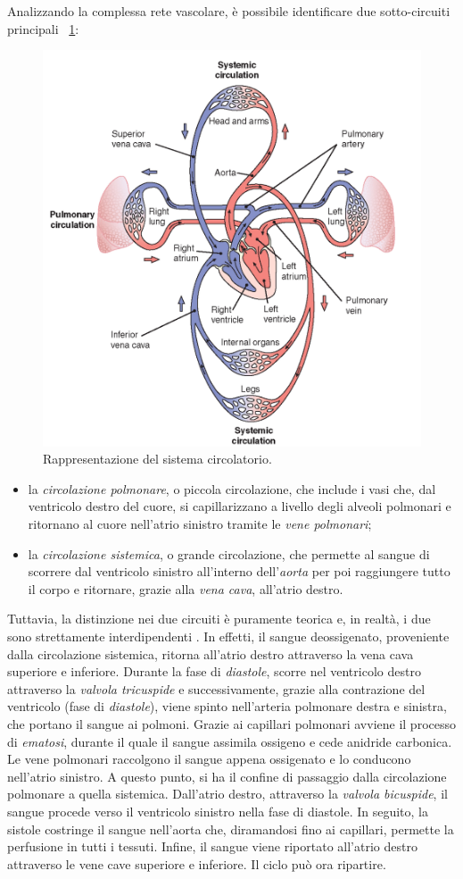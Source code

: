 Analizzando la complessa rete vascolare, è possibile identificare due sotto-circuiti principali \Fig~\ref{fig:SistemaCircolatorio}:
\begin{figure}[tb]
	\centering
	\includegraphics[width=0.7\linewidth]{ImageFiles/Fotopletismografia/SistemaCircolatorio}
	\caption{Rappresentazione del sistema circolatorio.}
	\label{fig:SistemaCircolatorio}
\end{figure}
\begin{itemize}
	\item la \textit{circolazione polmonare}, o piccola circolazione, che include i vasi che, dal ventricolo destro del cuore, si capillarizzano a livello degli alveoli polmonari e ritornano al cuore nell'atrio sinistro tramite le \textit{vene polmonari};
	\item la \textit{circolazione sistemica}, o grande circolazione, che permette al sangue di scorrere dal ventricolo sinistro all'interno dell'\textit{aorta} per poi raggiungere tutto il corpo e ritornare, grazie alla \textit{vena cava}, all'atrio destro.
\end{itemize}
Tuttavia, la distinzione nei due circuiti è puramente teorica e, in realtà, i due sono strettamente interdipendenti \cite{Cutfield1983}. In effetti, il sangue deossigenato, proveniente dalla circolazione sistemica, ritorna all'atrio destro attraverso la vena cava superiore e inferiore. Durante la fase di \textit{diastole}, scorre nel ventricolo destro attraverso la \textit{valvola tricuspide} e successivamente, grazie alla contrazione del ventricolo (fase di \textit{diastole}), viene spinto nell'arteria polmonare destra e sinistra, che portano il sangue ai polmoni. Grazie ai capillari polmonari avviene il processo di \textit{ematosi}, durante il quale il sangue assimila ossigeno e cede anidride carbonica. Le vene polmonari raccolgono il sangue appena ossigenato e lo conducono nell'atrio sinistro. A questo punto, si ha il confine di passaggio dalla circolazione polmonare a quella sistemica. Dall'atrio destro, attraverso la \textit{valvola bicuspide}, il sangue procede verso il ventricolo sinistro nella fase di diastole. In seguito, la sistole costringe il sangue nell'aorta che, diramandosi fino ai capillari, permette la perfusione in tutti i tessuti. Infine, il sangue viene riportato all'atrio destro attraverso le vene cave superiore e inferiore. Il ciclo può ora ripartire. 

